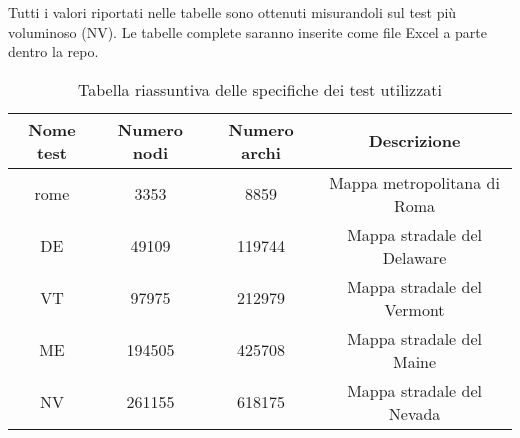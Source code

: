 \documentclass[a4paper]{article}
\begin{document}
	Tutti i valori riportati nelle tabelle sono ottenuti misurandoli sul test più voluminoso (NV). Le tabelle complete saranno inserite come file Excel a parte dentro la repo.
	\begin{table}[!ht]
		\centering
		\begin{tabular}{|c|c|c|c|}
			\hline
			\textbf{Nome test} & \textbf{Numero nodi} & \textbf{Numero archi} & \textbf{Descrizione} \\ \hline
			rome & 3353 & 8859 & Mappa metropolitana di Roma \\ \hline
			DE & 49109 & 119744 & Mappa stradale del Delaware \\ \hline
			VT & 97975 & 212979 & Mappa stradale del Vermont \\ \hline
			ME & 194505 & 425708 & Mappa stradale del Maine \\ \hline
			NV & 261155 & 618175 & Mappa stradale del Nevada \\ \hline
		\end{tabular}
		\label{tab:riassunto_test}
		\caption{Tabella riassuntiva delle specifiche dei test utilizzati}
	\end{table}
\end{document}
